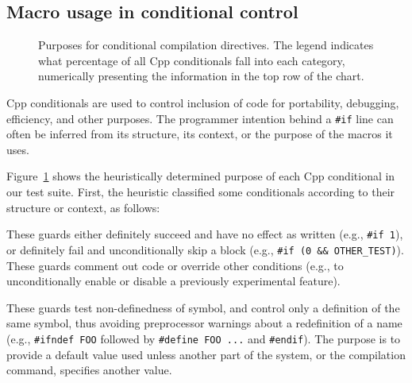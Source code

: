 \documentclass[10pt]{article}
\newcommand{\captionsmall}[1]{\caption[]{\small #1}}
\begin{document}


\subsection{Macro usage in conditional control}
\label{sec:ccd}

\begin{figure}
\centerline{}
\captionsmall{Purposes for conditional compilation directives.
  The legend indicates what percentage of all Cpp conditionals fall
  into each category, numerically presenting the information in the top row
  of the chart.}
\label{fig:ccd-categories}
\end{figure}

Cpp conditionals are used to control inclusion of code for portability,
debugging, efficiency, and other purposes.  The programmer intention behind
a {\tt \#if} line can often be inferred from its structure, its context, or
the purpose of the macros it uses.


Figure~\ref{fig:ccd-categories} shows the heuristically determined purpose
of each Cpp conditional in our test suite.  First, the heuristic classified
some conditionals according to their structure or context, as follows:
\begin{description}\itemsep 0pt \parskip 0pt
\item[Commenting] These guards either definitely succeed and
  have no effect as written (e.g., \texttt{\#if 1}), or definitely fail
  and unconditionally skip a block (e.g., {\tt \#if (0 \&\&
  \verb|OTHER_TEST|)}).  These guards comment out code or override other
  conditions (e.g., to unconditionally enable or disable a previously
  experimental feature).
      
\item[Redefinition suppression] These guards test non-definedness of
  symbol, and control only a definition of the same symbol, thus avoiding
  preprocessor warnings about a redefinition of a name (e.g.,
  \texttt{\#ifndef FOO} followed by \texttt{\#define FOO ...} and
  \texttt{\#endif}).  
  The purpose is to provide a default value used unless another part of the
  system, or the compilation command, specifies another value.

\end{description}
\end{document}
